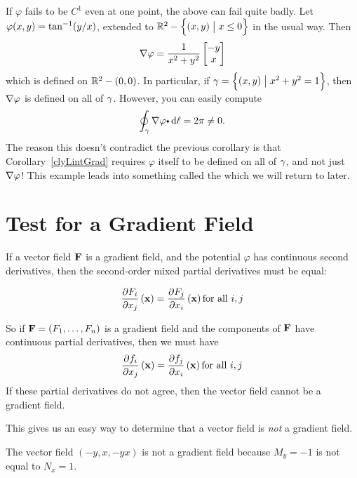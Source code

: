   
  
  
  
  \begin{exa} \label{not-simply-connected}
    If $\varphi$ fails to be $C^1$ even at one point, the above can fail quite badly.
    Let $\varphi(x, y) = \tan\inv(y/x)$, extended to $\bbR^2 - \set{(x, y) \st x \leq 0 }$ in the usual way.
    Then
    \begin{equation*}
      \grad \varphi = \dfrac{1}{x^2 + y^2} \colvec{ -y \\ x }
    \end{equation*}
    which is defined on $\bbR^2 - (0, 0)$.
    In particular, if $\caminho = \set{ (x, y) \st x^2 + y^2 = 1}$, then $\grad \varphi$ is defined on all of $\caminho$.
    However, you can easily compute
    \begin{equation*}
      \doint_\caminho \grad \varphi \bp \dif \ell = 2 \pi \neq 0.
    \end{equation*}
    The reason this doesn't contradict the previous corollary is that Corollary~\ref{clyLintGrad} requires $\varphi$ itself to be defined on all of $\caminho$, and not just $\grad \varphi$!
    This example leads into something called the  which we will return to later.
  \end{exa}

 

\section{Test for a Gradient Field}

If a vector field $\vector{F}$ is a gradient field, and the potential $\varphi$ has continuous
second derivatives, then the second-order mixed partial derivatives
must be equal: 

\[\partiald{j}{F_i}{x} = \partiald{i}{F_j}{x} \text{for all } i,j\]

So if $\vector{F} = (F_1, \dots, F_n)$ is a gradient field and the
components of $\vector{F}$ have continuous partial derivatives, then we must have
\[\partiald{j}{f_i}{x} = \partiald{i}{f_j}{x} \text{for all } i,j\]
If these partial derivatives do not agree, then the vector
field cannot be a gradient field. 

This gives us an easy way to
determine that a vector field is \emph{not} a gradient field.

\begin{exa}
The vector field $(-y,x,-yx)$ is not a
  gradient field because {$M_y=-1$} is not equal to {$N_x=1$}.
\end{exa}



